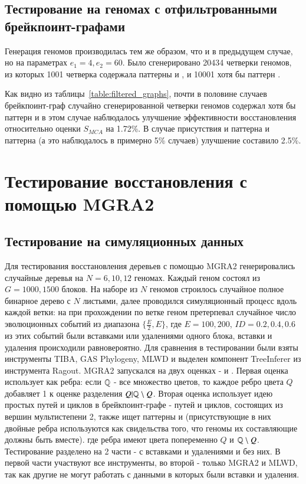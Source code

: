 \subsection{Тестирование на геномах с отфильтрованными брейкпоинт-графами}
Генерация геномов производилась тем же образом, что и в предыдущем случае, но на параметрах $e_1 = 4, e_2 = 60$.
Было сгенерировано 20434 четверки геномов, из которых 1001 четверка содержала паттерны  и ,
и 10001 хотя бы паттерн .

Как видно из таблицы~\ref{table:filtered_graphs}, почти в половине случаев брейкпоинт-граф случайно сгенерированной четверки геномов содержал
хотя бы паттерн  и в этом случае наблюдалось улучшение эффективности восстановления относительно оценки $S_{MCA}$ на 1.72\%.
В случае присутствия и паттерна  и паттерна  (а это наблюдалось в примерно 5\% случаев) улучшение составило 2.5\%.

\section{Тестирование восстановления с помощью MGRA2}
\subsection{Тестирование на симуляционных данных}
Для тестирования восстановления деревьев с помощью MGRA2 генерировались случайные деревья на $N = 6, 10, 12$ геномах.
Каждый геном состоял из $G = 1000, 1500$ блоков.
На наборе из $N$ геномов строилось случайное полное бинарное дерево с $N$ листьями, далее проводился симуляционный процесс вдоль каждой ветки:
на при прохождении по ветке геном претерпевал случайное число эволюционных событий из диапазона $\lbrace \frac{E}{2}, E \rbrace$,
где $E = 100, 200$, $ID = 0.2, 0.4, 0.6$ из этих событий были вставками или удалениями одного блока, вставки и удаления происходили равновероятно.
Для сравнения в тестировании были взяты инструменты TIBA, GAS Phylogeny, MLWD и выделен компонент TreeInferer из инструмента Ragout.
MGRA2 запускался на двух оценках -  и .
Первая оценка использует как  ребра: если $\mathbb{Q}$ - все множество цветов,
то каждое ребро цвета $Q$ добавляет 1 к оценке разделения $Q|\mathbb{Q} \setminus Q$.
Вторая оценка использует идею простых путей и циклов в брейкпоинт-графе - путей и циклов, состоящих из вершин мультистепени 2,
также ищет паттерны  и  (присутствующие в них двойные ребра используются как свидельства того, что геномы
их составляющие должны быть вместе).
где ребра имеют цвета попеременно $Q$ и $\mathbb{Q} \setminus Q$.
Тестирование разделено на 2 части - с вставками и удалениями и без них.
В первой части участвуют все инструменты, во второй - только MGRA2 и MLWD,
так как другие не могут работать с данными в которых были вставки и удаления.

